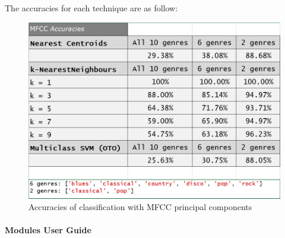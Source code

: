\documentclass[12pt]{article}
\begin{document}
	The accuracies for each technique are as follow:
	\begin{figure}[H]
		\hspace{120pt}\includegraphics[scale=0.44]{mfcc_acc}
		\caption{Accuracies of classification with MFCC principal components}
	\end{figure}
	
	
	\paragraph{Modules User Guide}\mbox{}
	\printbibliography
\end{document}
